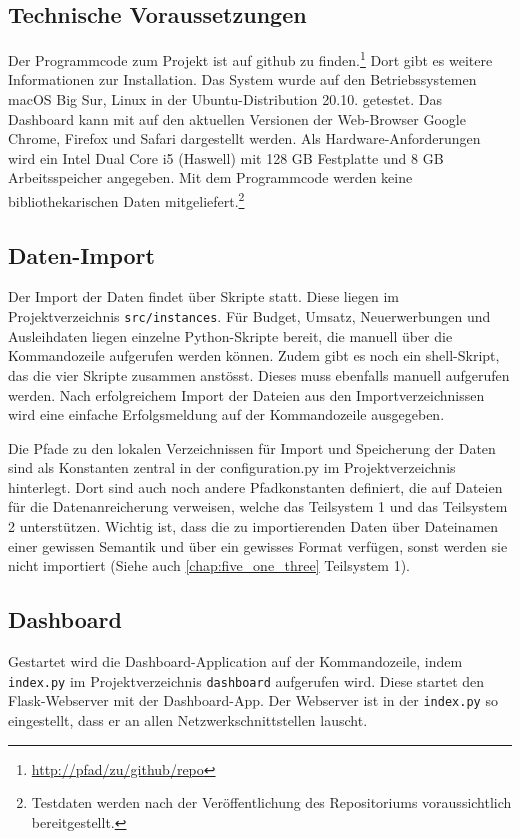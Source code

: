     \subsection{Technische Voraussetzungen}
    Der Programmcode zum Projekt ist auf github zu finden.\footnote{\url{http://pfad/zu/github/repo}} Dort gibt es weitere Informationen zur Installation.
    Das System wurde auf den Betriebssystemen macOS Big Sur, Linux in der Ubuntu-Distribution 20.10. getestet.
    Das Dashboard kann mit auf den aktuellen Versionen der Web-Browser Google Chrome, Firefox und Safari dargestellt werden. 
    Als Hardware-Anforderungen wird ein Intel Dual Core i5 (Haswell) mit 128 GB Festplatte und 8 GB Arbeitsspeicher angegeben. 
    Mit dem Programmcode werden keine bibliothekarischen Daten mitgeliefert.\footnote{Testdaten werden nach der Veröffentlichung des Repositoriums voraussichtlich
    bereitgestellt.}
    
    \subsection{Daten-Import}
    Der Import der Daten findet über Skripte statt. Diese liegen im Projektverzeichnis \texttt{src/instances}.
    Für Budget, Umsatz, Neuerwerbungen und Ausleihdaten liegen einzelne Python-Skripte bereit, die manuell über die Kommandozeile
    aufgerufen werden können. Zudem gibt es noch ein shell-Skript, das die vier Skripte zusammen anstösst. Dieses
    muss ebenfalls manuell aufgerufen werden.
    Nach erfolgreichem Import der Dateien aus den Importverzeichnissen wird eine einfache Erfolgsmeldung auf der Kommandozeile ausgegeben.

    Die Pfade zu den lokalen Verzeichnissen für Import und Speicherung der Daten sind als Konstanten zentral in der configuration.py 
    im Projektverzeichnis hinterlegt. Dort sind auch noch andere Pfadkonstanten definiert, die auf Dateien für die Datenanreicherung verweisen, welche das Teilsystem 1
    und das Teilsystem 2 unterstützen. Wichtig ist, dass die zu importierenden Daten über Dateinamen einer gewissen Semantik und 
    über ein gewisses Format verfügen, sonst werden sie nicht importiert (Siehe auch \autoref{chap:five_one_three} Teilsystem 1).

    \subsection{Dashboard}
    Gestartet wird die Dashboard-Application auf der Kommandozeile, indem \texttt{index.py} im Projektverzeichnis \texttt{dashboard}
    aufgerufen wird. Diese startet den Flask-Webserver mit der Dashboard-App. Der Webserver ist in der \texttt{index.py} so eingestellt, 
    dass er an allen Netzwerkschnittstellen lauscht.


